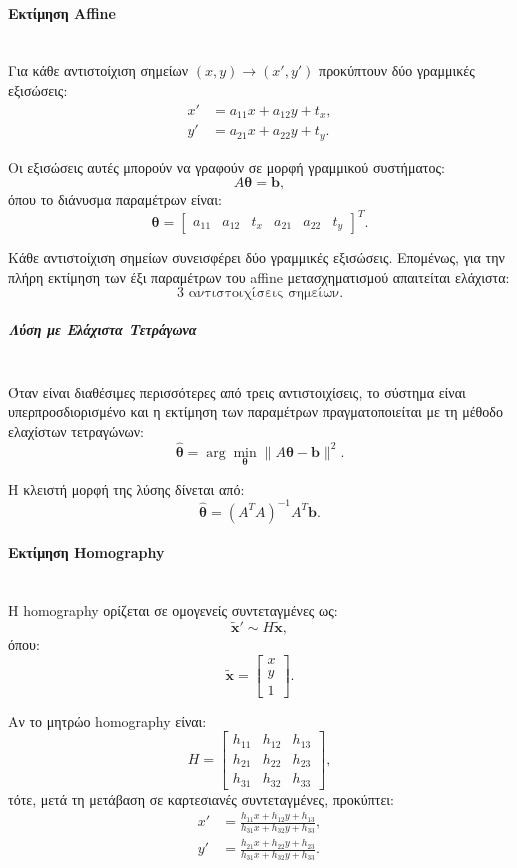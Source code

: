 \documentclass[12pt]{article}
\begin{document}
\paragraph{Εκτίμηση Affine}
\mbox{}\\
Για κάθε αντιστοίχιση σημείων \((x,y) \rightarrow (x',y')\) προκύπτουν δύο γραμμικές εξισώσεις:
\[
\begin{aligned}
x' &= a_{11}x + a_{12}y + t_x, \\
y' &= a_{21}x + a_{22}y + t_y.
\end{aligned}
\]

Οι εξισώσεις αυτές μπορούν να γραφούν σε μορφή γραμμικού συστήματος:
\[
A\boldsymbol{\theta} = \mathbf{b},
\]
όπου το διάνυσμα παραμέτρων είναι:
\[
\boldsymbol{\theta} =
\begin{bmatrix}
a_{11} & a_{12} & t_x & a_{21} & a_{22} & t_y
\end{bmatrix}^T.
\]

Κάθε αντιστοίχιση σημείων συνεισφέρει δύο γραμμικές εξισώσεις. Επομένως, για την πλήρη εκτίμηση των έξι παραμέτρων του affine μετασχηματισμού απαιτείται ελάχιστα:
\[
3 \text{ αντιστοιχίσεις σημείων}.
\]

\subparagraph{Λύση με Ελάχιστα Τετράγωνα}
\mbox{}\\
Όταν είναι διαθέσιμες περισσότερες από τρεις αντιστοιχίσεις, το σύστημα είναι υπερπροσδιορισμένο και η εκτίμηση των παραμέτρων πραγματοποιείται με τη μέθοδο ελαχίστων τετραγώνων:
\[
\hat{\boldsymbol{\theta}} =
\arg\min_{\boldsymbol{\theta}}
\|A\boldsymbol{\theta} - \mathbf{b}\|^2.
\]

Η κλειστή μορφή της λύσης δίνεται από:
\[
\hat{\boldsymbol{\theta}} =
(A^T A)^{-1} A^T \mathbf{b}.
\]


\paragraph{Εκτίμηση Homography}
\mbox{}\\
Η homography ορίζεται σε ομογενείς συντεταγμένες ως:
\[
\tilde{\mathbf{x}}' \sim H \tilde{\mathbf{x}},
\]
όπου:
\[
\tilde{\mathbf{x}} =
\begin{bmatrix}
x \\ y \\ 1
\end{bmatrix}.
\]

Αν το μητρώο homography είναι:
\[
H =
\begin{bmatrix}
h_{11} & h_{12} & h_{13} \\
h_{21} & h_{22} & h_{23} \\
h_{31} & h_{32} & h_{33}
\end{bmatrix},
\]
τότε, μετά τη μετάβαση σε καρτεσιανές συντεταγμένες, προκύπτει:
\[
\begin{aligned}
x' &= \frac{h_{11}x + h_{12}y + h_{13}}{h_{31}x + h_{32}y + h_{33}}, \\
y' &= \frac{h_{21}x + h_{22}y + h_{23}}{h_{31}x + h_{32}y + h_{33}}.
\end{aligned}
\]
\end{document}
